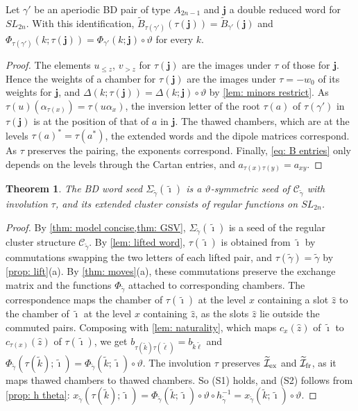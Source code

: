 \documentclass[a4paper]{amsart}
\numberwithin{equation}{section}
\newtheorem{theorem}{Theorem}[section]
\theoremstyle{definition}
\theoremstyle{remark}
\newcommand{\mcC}{\mathcal{C}}
\newcommand{\mcI}{\mathcal{I}}
\newcommand{\tbfi}{\widetilde{\boldsymbol{\imath}}}
\newcommand{\bfj}{\mathbf{j}}
\newcommand{\tB}{\widetilde{B}}
\newcommand{\tg}{\widetilde{\gamma}}
\newcommand{\vt}{\vartheta}
\newcommand{\ex}{{\rm ex}}
\newcommand{\fr}{{\rm fr}}
\newcommand{\SL}{SL_{2n}}
\begin{document}
\begin{lemma}
  \label{lem: naturality}
  Let $\gamma'$ be an aperiodic BD pair of type $A_{2n-1}$ and $\bfj$ a double reduced word for $\SL$.
  With this identification, $\tB_{\tau(\gamma')}(\tau(\bfj))=\tB_{\gamma'}(\bfj)$ and $\Phi_{\tau(\gamma')}(k;\tau(\bfj))=\Phi_{\gamma'}(k;\bfj)\circ\vt$ for every $k$.
\end{lemma}
\begin{proof}
  The elements $u_{\le z}$, $v_{>z}$ for $\tau(\bfj)$ are the images under $\tau$ of those for $\bfj$.
  Hence the weights of a chamber for $\tau(\bfj)$ are the images under $\tau=-w_0$ of its weights for $\bfj$, and $\Delta(k;\tau(\bfj))=\Delta(k;\bfj)\circ\vt$ by \cref{lem: minors restrict}.
  As $\tau(u)(\alpha_{\tau(x)})=\tau(u\alpha_x)$, the inversion letter of the root $\tau(a)$ of $\tau(\gamma')$ in $\tau(\bfj)$ is at the position of that of $a$ in $\bfj$.
  The thawed chambers, which are at the levels $\tau(a)^*=\tau(a^*)$, the extended words and the dipole matrices correspond.
  As $\tau$ preserves the pairing, the exponents correspond.
  Finally, \eqref{eq: B entries} only depends on the levels through the Cartan entries, and $a_{\tau(x)\tau(y)}=a_{xy}$.
\end{proof}

\begin{theorem}
  \label{thm: symmetric}
  The BD word seed $\Sigma_{\tg}(\tbfi)$ is a $\vt$-symmetric seed of $\mcC_{\tg}$ with involution $\tau$, and its extended cluster consists of regular functions on $\SL$.
\end{theorem}
\begin{proof}
  By \cref{thm: model concise,thm: GSV}, $\Sigma_{\tg}(\tbfi)$ is a seed of the regular cluster structure $\mcC_{\tg}$.
  By \cref{lem: lifted word}, $\tau(\tbfi)$ is obtained from $\tbfi$ by commutations swapping the two letters of each lifted pair, and $\tau(\tg)=\tg$ by \cref{prop: lift}(a).
  By \cref{thm: moves}(a), these commutations preserve the exchange matrix and the functions $\Phi_{\tg}$ attached to corresponding chambers.
  The correspondence maps the chamber of $\tau(\tbfi)$ at the level $x$ containing a slot $\widehat z$ to the chamber of $\tbfi$ at the level $x$ containing $\widehat z$, as the slots $\widehat z$ lie outside the commuted pairs.
  Composing with \cref{lem: naturality}, which maps $c_x(\widehat z)$ of $\tbfi$ to $c_{\tau(x)}(\widehat z)$ of $\tau(\tbfi)$, we get $b_{\tau(\widetilde{k})\tau(\widetilde{\ell})}=b_{\widetilde{k}\widetilde{\ell}}$ and $\Phi_{\tg}(\tau(\widetilde{k});\tbfi)=\Phi_{\tg}(\widetilde{k};\tbfi)\circ\vt$. The involution $\tau$ preserves $\widetilde{\mcI}_\ex$ and $\widetilde{\mcI}_\fr$, as it maps thawed chambers to thawed chambers.
  So (S1) holds, and (S2) follows from \cref{prop: h theta}: $x_{\tg}(\tau(\widetilde{k});\tbfi)=\Phi_{\tg}(\widetilde{k};\tbfi)\circ\vt\circ h_{\tg}^{-1}=x_{\tg}(\widetilde{k};\tbfi)\circ\vt$.
\end{proof}
\end{document}
